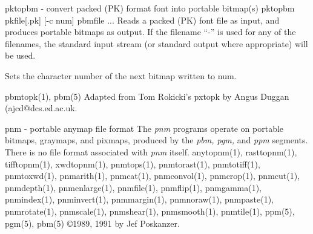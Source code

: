 \newpage
%

pktopbm - convert packed (PK) format font into portable bitmap(s)
pktopbm pkfile[.pk] [-c num] pbmfile ...
Reads a packed (PK) font file as input, and produces portable bitmaps as
output. If the filename ``-'' is used for any
of the filenames, the standard input stream (or standard output where
appropriate) will be used.
\begin{IPlist}
Sets the character number of the next bitmap written to num.
\end{IPlist}

pbmtopk(1), pbm(5)
Adapted from Tom Rokicki's pxtopk by Angus Duggan (ajcd@dcs.ed.ac.uk.

%
 
%

\newpage
%

pnm - portable anymap file format
The
{\it pnm}
programs operate on portable bitmaps, graymaps, and pixmaps, produced by the
{\it pbm, pgm,}
and
{\it ppm}
segments.  There is no file format associated with
{\it pnm}
itself.
anytopnm(1), rasttopnm(1), tifftopnm(1), xwdtopnm(1),
pnmtops(1), pnmtorast(1), pnmtotiff(1), pnmtoxwd(1),
pnmarith(1), pnmcat(1), pnmconvol(1), pnmcrop(1), pnmcut(1),
pnmdepth(1), pnmenlarge(1), pnmfile(1), pnmflip(1), pnmgamma(1),
pnmindex(1), pnminvert(1), pnmmargin(1), pnmnoraw(1), pnmpaste(1),
pnmrotate(1), pnmscale(1), pnmshear(1), pnmsmooth(1), pnmtile(1),
ppm(5), pgm(5), pbm(5)
\copyright 1989, 1991 by Jef Poskanzer.
%
 
